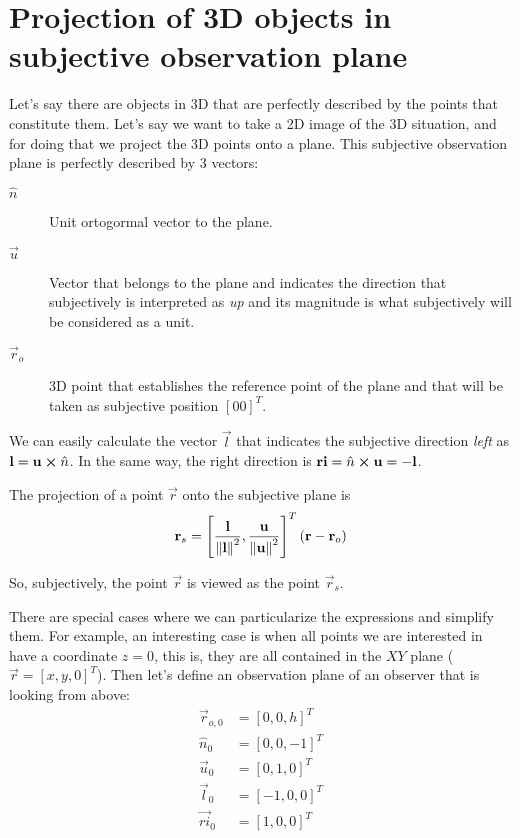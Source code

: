 \chapter{Projection of 3D objects in subjective observation plane}

Let's say there are objects in 3D that are perfectly described by the points that constitute them. Let's say we want to take a 2D image of the 3D situation, and for doing that we project the 3D points onto a plane. This subjective observation plane is perfectly described by 3 vectors:

\begin{description}
	\item[$\hat{n}$] Unit ortogormal vector to the plane.
	\item[$\vec{u}$] Vector that belongs to the plane and indicates the direction that subjectively is interpreted as \textit{up} and its magnitude is what subjectively will be considered as a unit.
	\item[$\vec{r}_o$] 3D point that establishes the reference point of the plane and that will be taken as subjective position $[0 0]^T$.
\end{description}

We can easily calculate the vector $\vec{l}$ that indicates the subjective direction \textit{left} as $\mathbf{l} = \mathbf{u} \cross \hat{n}$. In the same way, the right direction is $\mathbf{ri} = \hat{n} \cross \mathbf{u} = -\mathbf{l}$.

The projection of a point $\vec{r}$ onto the subjective plane is
\begin{equation}
\mathbf{r}_s = \left[\frac{\mathbf{l}}{\left\| \mathbf{l} \right\|^2}, \frac{\mathbf{u}}{\left\| \mathbf{u} \right\|^2}\right]^T (\mathbf{r} - \mathbf{r}_o)
\end{equation}

So, subjectively, the point $\vec{r}$ is viewed as the point $\vec{r}_s$.

There are special cases where we can particularize the expressions and simplify them. For example, an interesting case is when all points we are interested in have a coordinate $z = 0$, this is, they are all contained in the $XY$ plane ($\vec{r} = [x, y, 0]^T$). Then let's define an observation plane of an observer that is looking from above:
\begin{equation}
\begin{aligned}
\vec{r}_{o, 0} &= [0, 0, h]^T \\
\hat{n}_0 &= [0, 0, -1]^T \\
\vec{u}_0 &= [0, 1, 0]^T \\
\vec{l}_0 &= [-1, 0, 0]^T \\
\vec{ri}_0 &= [1, 0, 0]^T
\end{aligned}
\end{equation}

